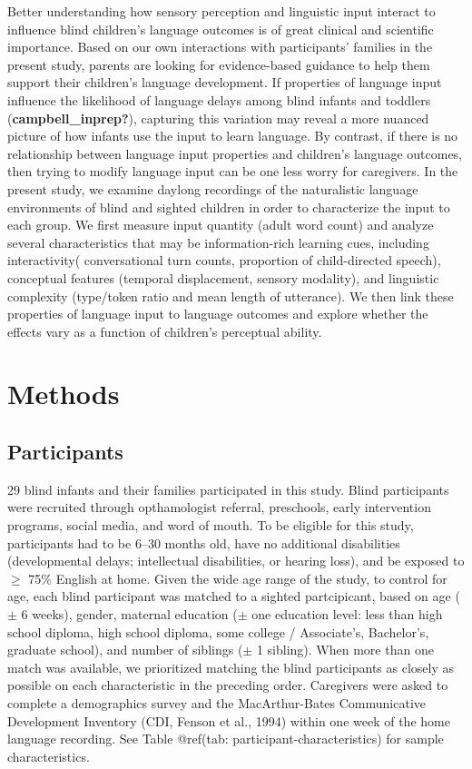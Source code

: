 \documentclass[
  man,floatsintext]{apa6}
\begin{document}
Better understanding how sensory perception and linguistic input interact to influence blind children's language outcomes is of great clinical and scientific importance. Based on our own interactions with participants' families in the present study, parents are looking for evidence-based guidance to help them support their children's language development. If properties of language input influence the likelihood of language delays among blind infants and toddlers (\textbf{campbell\_inprep?}), capturing this variation may reveal a more nuanced picture of how infants use the input to learn language. By contrast, if there is no relationship between language input properties and children's language outcomes, then trying to modify language input can be one less worry for caregivers. In the present study, we examine daylong recordings of the naturalistic language environments of blind and sighted children in order to characterize the input to each group. We first measure input quantity (adult word count) and analyze several characteristics that may be information-rich learning cues, including interactivity( conversational turn counts, proportion of child-directed speech), conceptual features (temporal displacement, sensory modality), and linguistic complexity (type/token ratio and mean length of utterance). We then link these properties of language input to language outcomes and explore whether the effects vary as a function of children's perceptual ability.

\hypertarget{methods}{%
\section{Methods}\label{methods}}

\hypertarget{participants}{%
\subsection{Participants}\label{participants}}

29 blind infants and their families participated in this study. Blind participants were recruited through opthamologist referral, preschools, early intervention programs, social media, and word of mouth. To be eligible for this study, participants had to be 6--30 months old, have no additional disabilities (developmental delays; intellectual disabilities, or hearing loss), and be exposed to \(\geq\) 75\% English at home. Given the wide age range of the study, to control for age, each blind participant was matched to a sighted partcipicant, based on age (\(\pm\) 6 weeks), gender, maternal education (\(\pm\) one education level: less than high school diploma, high school diploma, some college / Associate's, Bachelor's, graduate school), and number of siblings (\(\pm\) 1 sibling). When more than one match was available, we prioritized matching the blind participants as closely as possible on each characteristic in the preceding order. Caregivers were asked to complete a demographics survey and the MacArthur-Bates Communicative Development Inventory (CDI, Fenson et al., 1994) within one week of the home language recording. See Table @ref(tab: participant-characteristics) for sample characteristics.
\end{document}
